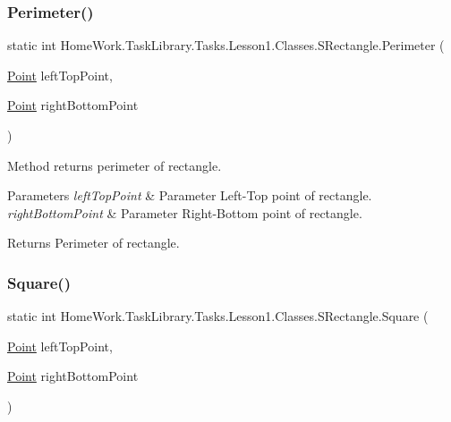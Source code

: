 \subsubsection{\texorpdfstring{Perimeter()}{Perimeter()}}
{\footnotesize\ttfamily static int Home\+Work.\+Task\+Library.\+Tasks.\+Lesson1.\+Classes.\+S\+Rectangle.\+Perimeter (\begin{DoxyParamCaption}\item[{\mbox{\hyperlink{struct_home_work_1_1_task_library_1_1_tasks_1_1_lesson1_1_1_classes_1_1_point}{Point}}}]{left\+Top\+Point,  }\item[{\mbox{\hyperlink{struct_home_work_1_1_task_library_1_1_tasks_1_1_lesson1_1_1_classes_1_1_point}{Point}}}]{right\+Bottom\+Point }\end{DoxyParamCaption})\hspace{0.3cm}{\ttfamily [static]}}



Method returns perimeter of rectangle. 


\begin{DoxyParams}{Parameters}
{\em left\+Top\+Point} & Parameter Left-\/\+Top point of rectangle.\\
\hline
{\em right\+Bottom\+Point} & Parameter Right-\/\+Bottom point of rectangle.\\
\hline
\end{DoxyParams}
\begin{DoxyReturn}{Returns}
Perimeter of rectangle.
\end{DoxyReturn}
\mbox{\label{class_home_work_1_1_task_library_1_1_tasks_1_1_lesson1_1_1_classes_1_1_s_rectangle_a5282ae8caf8c2698cc5a325974d99d4a}} 
\subsubsection{\texorpdfstring{Square()}{Square()}}
{\footnotesize\ttfamily static int Home\+Work.\+Task\+Library.\+Tasks.\+Lesson1.\+Classes.\+S\+Rectangle.\+Square (\begin{DoxyParamCaption}\item[{\mbox{\hyperlink{struct_home_work_1_1_task_library_1_1_tasks_1_1_lesson1_1_1_classes_1_1_point}{Point}}}]{left\+Top\+Point,  }\item[{\mbox{\hyperlink{struct_home_work_1_1_task_library_1_1_tasks_1_1_lesson1_1_1_classes_1_1_point}{Point}}}]{right\+Bottom\+Point }\end{DoxyParamCaption})\hspace{0.3cm}{\ttfamily [static]}}



